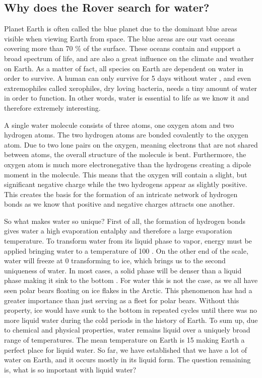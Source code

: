 \subsection*{Why does the Rover search for water?}

Planet Earth is often called the blue planet due to the dominant blue areas visible when viewing Earth from space. The blue areas are our vast oceans covering more than 70 \% \cite{WikiEarth} of the surface. These oceans contain and support a broad spectrum of life, and are also a great influence on the climate and weather on Earth. As a matter of fact, all species on Earth are dependent on water in order to survive. A human can only survive for 5 days without water \cite{SurviveWater}, and even extremophiles called xerophiles, dry loving bacteria, needs a tiny amount of water in order to function. In other words, water is essential to life as we know it and therefore extremely interesting. 

A single water molecule consists of three atoms, one oxygen atom and two hydrogen atoms. The two hydrogen atoms are bonded covalently to the oxygen atom. Due to two lone pairs on the oxygen, meaning electrons that are not shared between atoms, the overall structure of the molecule is bent. Furthermore, the oxygen atom is much more electronegative than the hydrogens creating a dipole moment in the molecule. This means that the oxygen will contain a slight, but significant negative charge while the two hydrogens appear as slightly positive. This creates the basis for the formation of an intricate network of hydrogen bonds as we know that positive and negative charges attracts one another.  

So what makes water so unique? First of all, the formation of hydrogen bonds gives water a high evaporation entalphy and therefore a large evaporation temperature. To transform water from its liquid phase to vapor, energy must be applied bringing water to a temperature of 100 \textcelsius. On the other end of the scale, water will freeze at 0 \textcelsius transforming to ice, which brings us to the second uniqueness of water. In most cases, a solid phase will be denser than a liquid phase making it sink to the bottom \cite{SolidWater}. For water this is not the case, as we all have seen polar bears floating on ice flakes in the Arctic. This phenomenon has had a greater importance than just serving as a fleet for polar bears. Without this property, ice would have sunk to the bottom in repeated cycles until there was no more liquid water during the cold periods in the history of Earth. To sum up, due to chemical and physical properties, water remains liquid over a uniquely broad range of temperatures. The mean temperature on Earth is 15 \textcelsius \cite{WikiEarth} making Earth a perfect place for liquid water. So far, we have established that we have a lot of water on Earth, and it occurs mostly in its liquid form. The question remaining is, what is so important with liquid water? 

